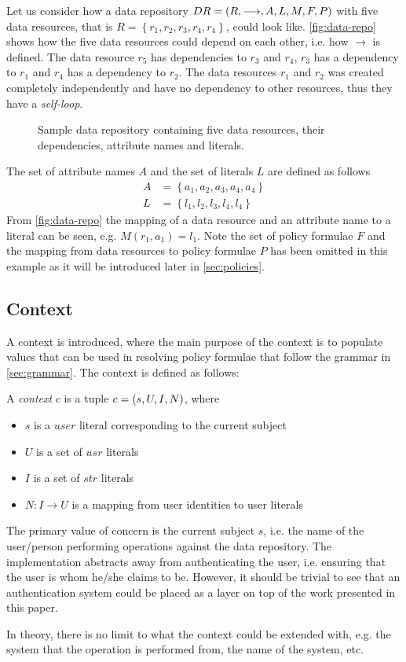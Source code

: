 \begin{example}\label{ex:data-repo}
Let us consider how a data repository $DR= \left( R, \longrightarrow, A, L, M, F, P \right)$ with five data resources, that is $R = \left\{ r_1, r_2, r_3, r_4, r_4 \right\}$, could look like. \autoref{fig:data-repo} shows how the five data resources could depend on each other, i.e. how $\longrightarrow$ is defined. The data resource $r_5$ has dependencies to $r_3$ and $r_4$, $r_3$ has a dependency to $r_1$ and $r_4$ has a dependency to $r_2$. The data resources $r_1$ and $r_2$ was created completely independently and have no dependency to other resources, thus they have a \emph{self-loop}.
\begin{figure}[!ht] 
    \begin{center}
        
        \caption{Sample data repository containing five data resources, their dependencies, attribute names and literals.}
        \label{fig:data-repo}
    \end{center}
\end{figure}
The set of attribute names $A$ and the set of literals $L$ are defined as follows
\begin{align*}
    A &= \left\{ a_1, a_2, a_3, a_4, a_4 \right\} \\
    L &= \left\{ l_1, l_2, l_3, l_4, l_4 \right\}
\end{align*}
From \autoref{fig:data-repo} the mapping of a data resource and an attribute name to a literal can be seen, e.g. $M(r_1, a_1) = l_1$. Note the set of policy formulae $F$ and the mapping from data resources to policy formulae $P$ has been omitted in this example as it will be introduced later in \autoref{sec:policies}.
\end{example}

\subsection{Context}
A context is introduced, where the main purpose of the context is to populate values that can be used in resolving policy formulae that follow the grammar in \autoref{sec:grammar}. The context is defined as follows:
\begin{definition}[Context]
A \emph{context} $c$ is a tuple $c = \left( s, U, I, N \right)$, where
\begin{itemize}
    \item $s$ is a $user$ literal corresponding to the current subject
    \item $U$ is a set of $usr$ literals
    \item $I$ is a set of $str$ literals
    \item $N : I \rightarrow U$ is a mapping from user identities to user literals
\end{itemize}
\end{definition}
The primary value of concern is the current subject $s$, i.e. the name of the user/person performing operations against the data repository. The implementation abstracts away from authenticating the user, i.e. ensuring that the user is whom he/she claims to be. However, it should be trivial to see that an authentication system could be placed as a layer on top of the work presented in this paper.

In theory, there is no limit to what the context could be extended with, e.g. the system that the operation is performed from, the name of the system, etc.



